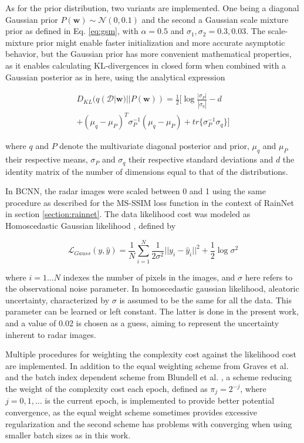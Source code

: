 As for the prior distribution, two variants are implemented. One being a diagonal Gaussian prior $P(\pmb{w}) \sim \mathcal{N}(0,0.1)$ and the second a Gaussian scale mixture prior as defined in Eq. \ref{eq:gsm}, with $\alpha = 0.5$ and $\sigma_1, \sigma_2 = 0.3, 0.03$. The scale-mixture prior might enable faster initialization and more accurate asymptotic behavior, but the Gaussian prior has more convenient mathematical properties, as it enables calculating KL-divergences in closed form when combined with a Gaussian posterior as in here, using the analytical expression

\begin{equation}
\begin{split}
D_{KL}(q(\mathcal{D}|\pmb{w}) || P(\pmb{w})) =
\frac{1}{2}[\log \frac{|\sigma_P|}{|\sigma_q|}
- d \\
+ (\mu_q - \mu_P)^T \sigma_P^{-1}(\mu_q - \mu_P)
+ tr\{\sigma_P^{-1}\sigma_q\}
]
\end{split}
\end{equation}

where $q$ and $P$ denote the multivariate diagonal posterior and prior, $\mu_q$ and $\mu_P$ their respective means, $\sigma_P$ and $\sigma_q$ their respective standard deviations and  $d$ the identity matrix of the number of dimensions equal to that of the distributions. 

In BCNN, the radar images were scaled between 0 and 1 using the same procedure as described for the MS-SSIM loss function in the context of RainNet in section \ref{section:rainnet}. The data likelihood cost was modeled as Homoscedastic Gaussian likelihood \cite{kendall_what_2017}, defined by 

\begin{equation}
	\mathcal{L}_{Gauss}(y, \hat{y}) = \frac{1}{N} \sum_{i=1}^{N} \frac{1}{2\sigma^2}||y_i - \hat{y}_i||^2 
	+ \frac{1}{2} \log \sigma^2
\end{equation}

where $i = 1 \dots N$ indexes the number of pixels in the images, and $\sigma$ here refers to the observational noise parameter. In homoscedastic gaussian likelihood, aleatoric uncertainty, characterized by $\sigma$ is assumed to be the same for all the data. This parameter can be learned or left constant. The latter is done in the present work, and a value of 0.02 is chosen as a guess, aiming to represent the uncertainty inherent to radar images. 

Multiple procedures for weighting the complexity cost against the likelihood cost are implemented. In addition to the equal weighting scheme from Graves et al. \cite{graves_practical_2011} and the batch index dependent scheme from Blundell et al. \cite{blundell_weight_2015}, a scheme reducing the weight of the complexity cost each epoch, defined as $\pi_j = 2^{-j}$, where $j=0,1,\dots$ is the current epoch, is implemented to provide better potential convergence, as the equal weight scheme sometimes provides excessive regularization and the second scheme has problems with converging when using smaller batch sizes as in this work.


